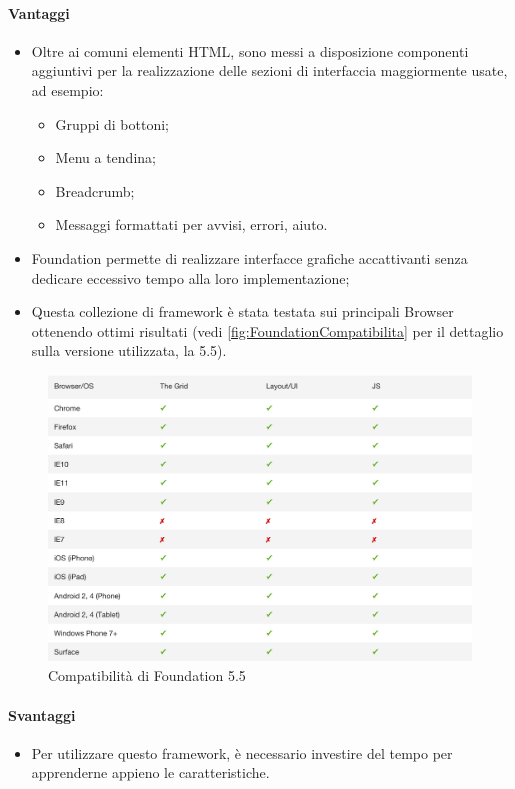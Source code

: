\paragraph{Vantaggi}
	\begin{itemize}
		\item Oltre ai comuni elementi HTML, sono messi a disposizione componenti aggiuntivi per la realizzazione delle sezioni di interfaccia maggiormente usate, ad esempio: 
		\begin{itemize}
			\item Gruppi di bottoni;
			\item Menu a tendina;
			\item \gls{Breadcrumb};
			\item Messaggi formattati per avvisi, errori, aiuto.
		\end{itemize}\item Foundation permette di realizzare interfacce grafiche accattivanti senza dedicare eccessivo tempo alla loro implementazione;
		\item Questa collezione di framework è stata testata sui principali Browser ottenendo ottimi risultati (vedi \autoref{fig:FoundationCompatibilita} per il dettaglio sulla versione utilizzata, la 5.5).
	\end{itemize}
	\begin{figure}[H]
		\begin{center}
			\includegraphics[width=15cm]{Pics/foundation5_compatibilita.png}
			\caption{Compatibilità di Foundation 5.5}
			\label{fig:FoundationCompatibilita}
		\end{center}
	\end{figure}
\paragraph{Svantaggi}
	\begin{itemize}
		\item Per utilizzare questo framework, è necessario investire del tempo per apprenderne appieno le caratteristiche.
	\end{itemize}
